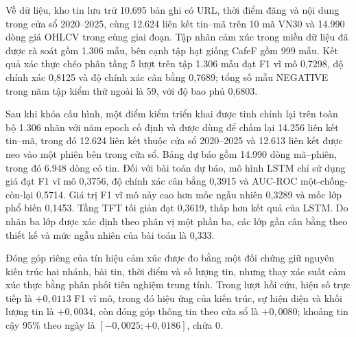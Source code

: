 \documentclass[12pt, a4paper, oneside]{report}
\begin{document}
Về dữ liệu, kho tin lưu trữ 10.695 bản ghi có URL, thời điểm đăng và nội dung trong cửa
sổ 2020--2025, cùng 12.624 liên kết tin--mã trên 10 mã VN30 và 14.990 dòng giá
OHLCV trong cùng giai đoạn. Tập nhãn cảm xúc trong miền dữ liệu đã được rà soát
gồm 1.306 mẫu, bên cạnh tập hạt giống CafeF gồm 999 mẫu. Kết quả xác thực chéo phân tầng
5 lượt trên tập 1.306 mẫu đạt F1 vĩ mô 0,7298, độ chính xác 0,8125 và độ chính xác cân
bằng 0,7689; tổng số mẫu NEGATIVE trong năm tập kiểm thử ngoài là 59, với độ bao phủ
0,6803.

Sau khi khóa cấu hình, một điểm kiểm triển khai được tinh chỉnh lại trên toàn bộ 1.306
nhãn với năm epoch cố định và được dùng để chấm lại 14.256 liên kết tin--mã, trong đó
12.624 liên kết thuộc cửa sổ 2020--2025 và 12.613 liên kết được neo vào một phiên bên
trong cửa sổ. Bảng dự báo gồm 14.990 dòng mã--phiên, trong đó 6.948 dòng có tin. Đối với
bài toán dự báo, mô hình LSTM chỉ sử dụng giá đạt F1 vĩ mô 0,3756, độ chính xác cân bằng
0,3915 và AUC-ROC một-chống-còn-lại 0,5714. Giá trị F1 vĩ mô này cao hơn mốc ngẫu nhiên
0,3289 và mốc lớp phổ biến 0,1453. Tầng TFT tối giản đạt 0,3619, thấp hơn kết quả của
LSTM. Do nhãn ba lớp được xác định theo phân vị một phần ba, các lớp gần cân bằng theo
thiết kế và mức ngẫu nhiên của bài toán là 0,333.

Đóng góp riêng của tín hiệu cảm xúc được đo bằng một đối chứng giữ nguyên kiến
trúc hai nhánh, bài tin, thời điểm và số lượng tin, nhưng thay xác suất cảm
xúc thực bằng phân phối tiên nghiệm trung tính. Trong lượt hồi cứu, hiệu số trực tiếp
là $+0{,}0113$ F1 vĩ mô, trong đó hiệu ứng của kiến trúc, sự hiện diện và khối lượng
tin là $+0{,}0034$, còn đóng góp thông tin theo cửa sổ là $+0{,}0080$; khoảng tin
cậy 95\% theo ngày là $[-0{,}0025; +0{,}0186]$, chứa 0.
\end{document}
